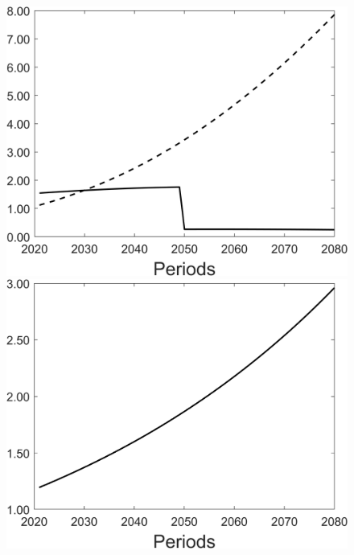 \begin{figure}[h!!]
\begin{minipage}[]{0.32\textwidth}
	\end{minipage}
	\begin{minipage}[]{0.32\textwidth}
		\includegraphics[width=1\textwidth]{../../codding_model/Own/figures/Rep_agent/staticRam_LF_separate_xc_periods59_eppsilon0.40_zeta1.40_Ad08_Ac04_thetac0.70_thetad0.56_HetGrowth1_tauul0.181_util0_withtarget1_lgd0.png}
	\end{minipage}
	\begin{minipage}[]{0.32\textwidth}
		\includegraphics[width=1\textwidth]{../../codding_model/Own/figures/Rep_agent/staticRam_LF_separate_ydyc_periods59_eppsilon0.40_zeta1.40_Ad08_Ac04_thetac0.70_thetad0.56_HetGrowth1_tauul0.181_util0_withtarget1_lgd0.png}
	\end{minipage}
\end{figure}


